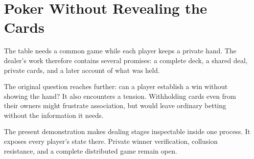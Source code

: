 \chapter{Poker Without Revealing the Cards}
\label{short:poker}

The table needs a common game while each player keeps a private hand. The
dealer's work therefore contains several promises: a complete deck, a shared
deal, private cards, and a later account of what was held.

The original question reaches further: can a player establish a win without
showing the hand? It also encounters a tension. Withholding cards even from
their owners might frustrate association, but would leave ordinary betting
without the information it needs.

The present demonstration makes dealing stages inspectable inside one
process. It exposes every player's state there. Private winner verification,
collusion resistance, and a complete distributed game remain open.

